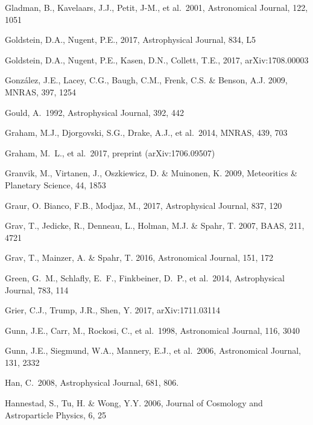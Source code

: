 \documentclass[twocolumn]{aastex61}
\begin{document}
\begin{thebibliography}{}
 Gladman, B., Kavelaars, J.J., Petit, J-M., et al.~2001, Astronomical Journal, 122, 1051

 Goldstein, D.A., Nugent, P.E., 2017, Astrophysical Journal, 834, L5

 Goldstein, D.A., Nugent, P.E., Kasen, D.N., Collett, T.E., 2017, arXiv:1708.00003

 Gonz\'{a}lez, J.E., Lacey, C.G., Baugh, C.M., Frenk, C.S. \& Benson, A.J. 2009, MNRAS, 397, 1254

 Gould, A.\ 1992, Astrophysical Journal, 392, 442

 Graham, M.J., Djorgovski, S.G., Drake, A.J., et al.~2014, MNRAS, 439, 703

 Graham, M.~L., et al.~2017, preprint (arXiv:1706.09507)

 Granvik, M., Virtanen, J., Oszkiewicz, D. \& Muinonen, K. 2009, Meteoritics \& Planetary Science, 44, 1853

 Graur, O. Bianco, F.B., Modjaz, M., 2017, Astrophysical Journal, 837, 120

 Grav, T., Jedicke, R., Denneau, L., Holman, M.J.  \& Spahr, T. 2007, BAAS, 211, 4721

 Grav, T., Mainzer, A. \& Spahr, T. 2016, Astronomical Journal, 151, 172

 Green, G.~M., Schlafly, E.~F., Finkbeiner, D.~P., et al.~2014, Astrophysical Journal, 783, 114

 Grier, C.J., Trump, J.R., Shen, Y. 2017, arXiv:1711.03114

 Gunn, J.E., Carr, M., Rockosi, C., et al.~1998, Astronomical Journal, 116, 3040

 Gunn, J.E., Siegmund, W.A., Mannery, E.J., et al.~2006, Astronomical Journal, 131, 2332

 Han, C.~2008, Astrophysical Journal, 681, 806.

 Hannestad, S., Tu, H. \& Wong, Y.Y. 2006, Journal of Cosmology and Astroparticle Physics, 6, 25


\end{thebibliography}
\end{document}
